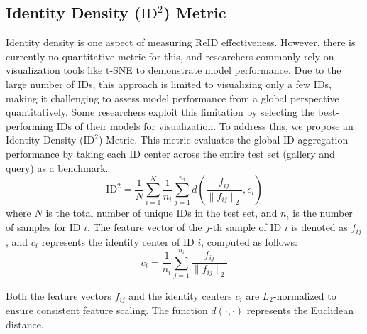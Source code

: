 



\subsection{Identity Density ($\text{ID}^2$) Metric}
Identity density is one aspect of measuring ReID effectiveness. However, there is currently no quantitative metric for this, and researchers commonly rely on visualization tools like t-SNE to demonstrate model performance. Due to the large number of IDs, this approach is limited to visualizing only a few IDs, making it challenging to assess model performance from a global perspective quantitatively. Some researchers exploit this limitation by selecting the best-performing IDs of their models for visualization. To address this, we propose an Identity Density ($\text{ID}^2$) Metric. This metric evaluates the global ID aggregation performance by taking each ID center across the entire test set (gallery and query) as a benchmark.
\begin{equation}
\text{ID}^2 = \frac{1}{N} \sum_{i=1}^{N} \frac{1}{n_i} \sum_{j=1}^{n_i} d\left( \frac{f_{ij}}{\|f_{ij}\|_2}, c_i \right)
\end{equation}
where \( N \) is the total number of unique IDs in the test set, and \( n_i \) is the number of samples for ID \( i \). The feature vector of the \( j \)-th sample of ID \( i \) is denoted as \( f_{ij} \), and \( c_i \) represents the identity center of ID \( i \), computed as follows:
\begin{equation}
c_i = \frac{1}{n_i} \sum_{j=1}^{n_i} \frac{f_{ij}}{\|f_{ij}\|_2}
\end{equation}

Both the feature vectors \( f_{ij} \) and the identity centers \( c_i \) are \( L_2 \)-normalized to ensure consistent feature scaling. The function \( d(\cdot, \cdot) \) represents the Euclidean distance. 

